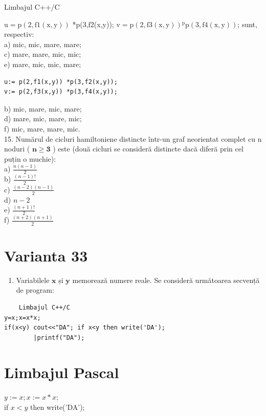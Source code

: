 \documentclass[10pt]{article}
\begin{document}
Limbajul C++/C

$\mathrm{u}=\mathrm{p}(2, \mathrm{f} 1(\mathrm{x}, \mathrm{y}))$ *p(3,f2(x,y)); $\mathrm{v}=\mathrm{p}(2, \mathrm{f} 3(\mathrm{x}, \mathrm{y})){ }^{\mathrm{p}} \mathrm{p}(3, \mathrm{f} 4(\mathrm{x}, \mathrm{y}))$; sunt, respectiv:\\
a) mic, mic, mare, mare;\\
c) mare, mare, mic, mic;\\
e) mare, mic, mic, mare;

\begin{verbatim}
u:= p(2,f1(x,y)) *p(3,f2(x,y));
v:= p(2,f3(x,y)) *p(3,f4(x,y));
\end{verbatim}

b) mic, mare, mic, mare;\\
d) mare, mic, mare, mic;\\
f) mic, mare, mare, mic.\\
15. Numărul de cicluri hamiltoniene distincte într-un graf neorientat complet cu n noduri ( $\mathbf{n} \geq \mathbf{3}$ ) este (două cicluri se consideră distincte dacă diferă prin cel puțin o muchie):\\
a) $\frac{n(n-1)}{2}$\\
b) $\frac{(n-1)!}{2}$\\
c) $\frac{(n-2)(n-1)}{2}$\\
d) $n-2$\\
e) $\frac{(n+1)!}{2}$\\
f) $\frac{(n+2)(n+1)}{2}$

\section*{Varianta 33}
\begin{enumerate}
  \item Variabilele $\mathbf{x}$ și $\mathbf{y}$ memorează numere reale. Se consideră următoarea secvență de program:
\end{enumerate}

\begin{verbatim}
    Limbajul C++/C
y=x;x=x*x;
if(x<y) cout<<"DA"; if x<y then write('DA');
        |printf("DA");
\end{verbatim}

\section*{Limbajul Pascal}
$y:=x ; x:=x * x$;\\
if $x<y$ then write('DA');
\end{document}
